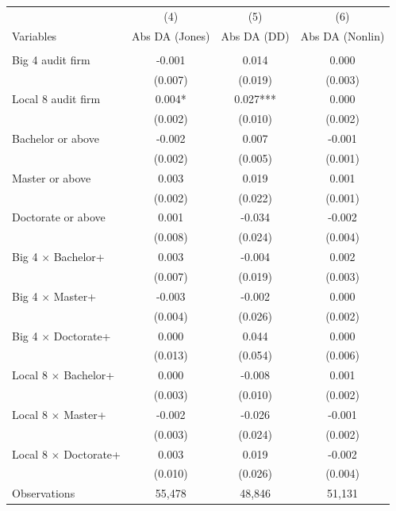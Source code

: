 \documentclass[10pt]{article}
\begin{document}
\begin{minipage}{19cm}\fontsize{10}{12}\selectfont\setlength{\tabcolsep}{4pt}\renewcommand{\arraystretch}{1.12}


\centering
{}
\begin{threeparttable}
\begin{tabular}{p{}ccc}
\toprule
 & (4) & (5) & (6) \\
Variables & Abs DA (Jones) & Abs DA (DD) & Abs DA (Nonlin) \\
\midrule
\addlinespace
\multicolumn{4}{l}{\textbf{Panel A: Cumulative degree thresholds (base: below bachelor)}} \\
Big 4 audit firm & -0.001 & 0.014 & 0.000 \\
 & (0.007) & (0.019) & (0.003) \\
Local 8 audit firm & 0.004* & 0.027*** & 0.000 \\
 & (0.002) & (0.010) & (0.002) \\
Bachelor or above & -0.002 & 0.007 & -0.001 \\
 & (0.002) & (0.005) & (0.001) \\
Master or above & 0.003 & 0.019 & 0.001 \\
 & (0.002) & (0.022) & (0.001) \\
Doctorate or above & 0.001 & -0.034 & -0.002 \\
 & (0.008) & (0.024) & (0.004) \\
Big 4 $\times$ Bachelor+ & 0.003 & -0.004 & 0.002 \\
 & (0.007) & (0.019) & (0.003) \\
Big 4 $\times$ Master+ & -0.003 & -0.002 & 0.000 \\
 & (0.004) & (0.026) & (0.002) \\
Big 4 $\times$ Doctorate+ & 0.000 & 0.044 & 0.000 \\
 & (0.013) & (0.054) & (0.006) \\
Local 8 $\times$ Bachelor+ & 0.000 & -0.008 & 0.001 \\
 & (0.003) & (0.010) & (0.002) \\
Local 8 $\times$ Master+ & -0.002 & -0.026 & -0.001 \\
 & (0.003) & (0.024) & (0.002) \\
Local 8 $\times$ Doctorate+ & 0.003 & 0.019 & -0.002 \\
 & (0.010) & (0.026) & (0.004) \\
Observations & 55,478 & 48,846 & 51,131 \\

\end{tabular}
\end{threeparttable}
\end{minipage}
\end{document}

